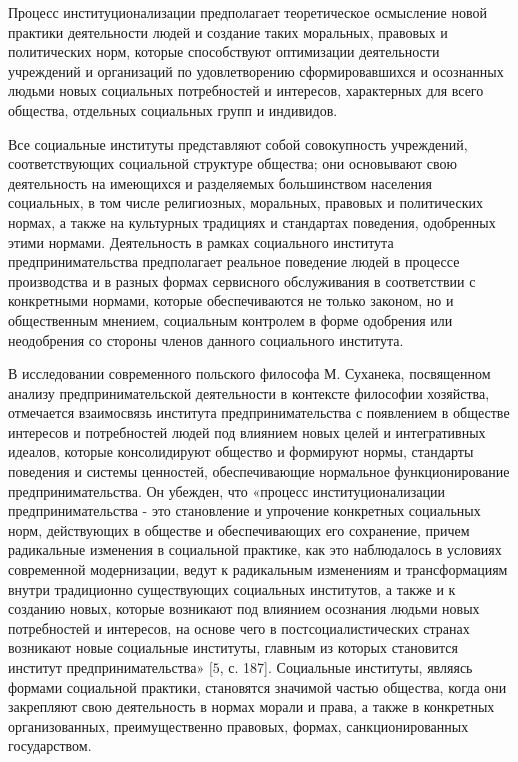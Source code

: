 \documentclass[a4paper, 12pt]{article}%
\begin{document}
Процесс институционализации предполагает теоретическое осмысление новой практики деятельности людей и создание таких моральных, правовых и политических норм, которые способствуют оптимизации деятельности учреждений и организаций по удовлетворению сформировавшихся и осознанных людьми новых социальных потребностей и интересов, характерных для всего общества, отдельных социальных групп и индивидов.

Все социальные институты представляют собой совокупность учреждений, соответствующих социальной структуре общества; они основывают свою деятельность на имеющихся и разделяемых большинством населения социальных, в том числе религиозных, моральных, правовых и политических нормах, а также на культурных традициях и стандартах поведения, одобренных этими нормами. Деятельность в рамках социального института предпринимательства предполагает реальное поведение людей в процессе производства и в разных формах сервисного обслуживания в соответствии с конкретными нормами, которые обеспечиваются не только законом, но и общественным мнением, социальным контролем в форме одобрения или неодобрения со стороны членов данного социального института.

В исследовании современного польского философа М. Суханека, посвященном анализу предпринимательской деятельности в контексте философии хозяйства, отмечается взаимосвязь института предпринимательства с появлением в обществе интересов и потребностей людей под влиянием новых целей и интегративных идеалов, которые консолидируют общество и формируют нормы, стандарты поведения и системы ценностей, обеспечивающие нормальное функционирование предпринимательства. Он убежден, что «процесс институционализации предпринимательства - это становление и упрочение конкретных социальных норм, действующих в обществе и обеспечивающих его сохранение, причем радикальные изменения в социальной практике, как это наблюдалось в условиях современной модернизации, ведут к радикальным изменениям и трансформациям внутри традиционно существующих социальных институтов, а также и к созданию новых, которые возникают под влиянием осознания людьми новых потребностей и интересов, на основе чего в постсоциалистических странах возникают новые социальные институты, главным из которых становится институт предпринимательства» $[5$, с. 187]. Социальные институты, являясь формами социальной практики, становятся значимой частью общества, когда они закрепляют свою деятельность в нормах морали и права, а также в конкретных организованных, преимущественно правовых, формах, санкционированных государством.
\end{document}

